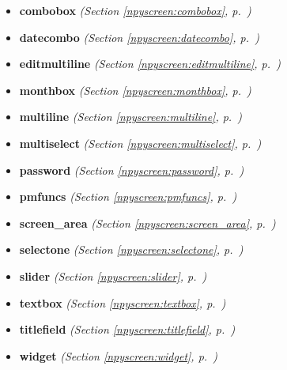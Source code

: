 \begin{itemize}
\item \textbf{combobox}
  \textit{(Section \ref{npyscreen:combobox}, p.~\pageref{npyscreen:combobox})}

\item \textbf{datecombo}
  \textit{(Section \ref{npyscreen:datecombo}, p.~\pageref{npyscreen:datecombo})}

\item \textbf{editmultiline}
  \textit{(Section \ref{npyscreen:editmultiline}, p.~\pageref{npyscreen:editmultiline})}

\item \textbf{monthbox}
  \textit{(Section \ref{npyscreen:monthbox}, p.~\pageref{npyscreen:monthbox})}

\item \textbf{multiline}
  \textit{(Section \ref{npyscreen:multiline}, p.~\pageref{npyscreen:multiline})}

\item \textbf{multiselect}
  \textit{(Section \ref{npyscreen:multiselect}, p.~\pageref{npyscreen:multiselect})}

\item \textbf{password}
  \textit{(Section \ref{npyscreen:password}, p.~\pageref{npyscreen:password})}

\item \textbf{pmfuncs}
  \textit{(Section \ref{npyscreen:pmfuncs}, p.~\pageref{npyscreen:pmfuncs})}

\item \textbf{screen\_area}
  \textit{(Section \ref{npyscreen:screen_area}, p.~\pageref{npyscreen:screen_area})}

\item \textbf{selectone}
  \textit{(Section \ref{npyscreen:selectone}, p.~\pageref{npyscreen:selectone})}

\item \textbf{slider}
  \textit{(Section \ref{npyscreen:slider}, p.~\pageref{npyscreen:slider})}

\item \textbf{textbox}
  \textit{(Section \ref{npyscreen:textbox}, p.~\pageref{npyscreen:textbox})}

\item \textbf{titlefield}
  \textit{(Section \ref{npyscreen:titlefield}, p.~\pageref{npyscreen:titlefield})}

\item \textbf{widget}
  \textit{(Section \ref{npyscreen:widget}, p.~\pageref{npyscreen:widget})}

\end{itemize}

